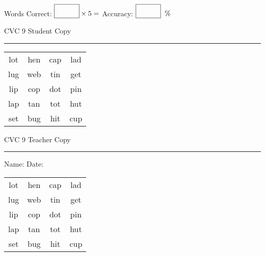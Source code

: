 \documentclass{memoir}
\begin{document}
\small

Words Correct: $\fbox{\phantom{\huge 100}} \times 5 = $ Accuracy: $\fbox{\phantom{\huge 100}}\;\; \%$ 

\vfill

\newpage


\footnotesize \noindent
CVC 9 \hfill Student Copy
\smallskip
\hrule

\Large

\setlength{\tabcolsep}{14pt}
\def\arraystretch{2}

{\selectfont


\begin{vplace}[0.5]
\begin{center}
\begin{tabular}{cccc}
lot & hen & cap & lad \\
lug & web & tin & get \\
lip & cop & dot & pin \\
lap & tan & tot & hut \\
set & bug & hit & cup \\
\end{tabular}
\end{center}
\end{vplace}

}

\newpage

\footnotesize \noindent
CVC 9 \hfill Teacher Copy
\smallskip
\hrule

\small

\vfill

\noindent
Name: \underline{\hspace{1.75in}} \hfill Date: \underline{\hspace{1in}}

\Large

{\selectfont


\begin{vplace}[0.5]
\begin{center}
\begin{tabular}{cccc}
lot & hen & cap & lad \\
lug & web & tin & get \\
lip & cop & dot & pin \\
lap & tan & tot & hut \\
set & bug & hit & cup \\
\end{tabular}
\end{center}
\end{vplace}



}
\end{document}
